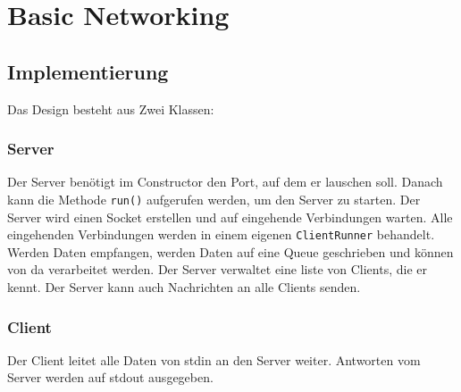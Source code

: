 \chapter{Basic Networking}

\section{Implementierung}
Das Design besteht aus Zwei Klassen:

\subsection{Server}
Der Server benötigt im Constructor den Port, auf dem er lauschen soll.
Danach kann die Methode \texttt{run()} aufgerufen werden, um den Server zu starten.
Der Server wird einen Socket erstellen und auf eingehende Verbindungen warten.
Alle eingehenden Verbindungen werden in einem eigenen \texttt{ClientRunner} behandelt.
Werden Daten empfangen, werden Daten auf eine Queue geschrieben und können von da verarbeitet werden.
Der Server verwaltet eine liste von Clients, die er kennt. Der Server kann auch Nachrichten an alle Clients senden.

\subsection{Client}
Der Client leitet alle Daten von stdin an den Server weiter. Antworten vom Server werden auf stdout ausgegeben.



